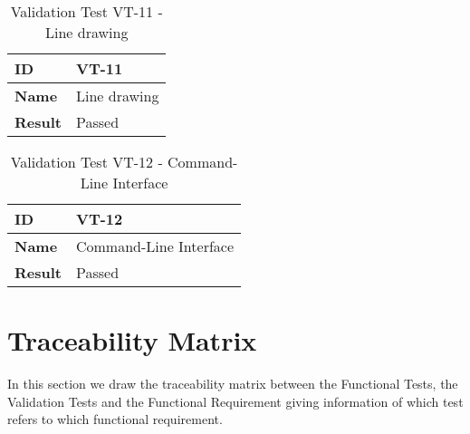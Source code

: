 \begin{table}[H]
    \centering
    \begin{tabular}{| p{3cm} | p{7cm} |}
    \hline
    \textbf{ID}             & VT-11 \\ \hline
    \textbf{Name}           & Line drawing\\ \hline
    \textbf{Result}         & \textcolor{mygreen}{Passed}\\ \hline
    \end{tabular}
    \caption{Validation Test VT-11 - Line drawing}
\end{table}

\begin{table}[H]
    \centering
    \begin{tabular}{| p{3cm} | p{7cm} |}
    \hline
    \textbf{ID}             & VT-12 \\ \hline
    \textbf{Name}           & Command-Line Interface\\ \hline
    \textbf{Result}         & \textcolor{mygreen}{Passed}\\ \hline
    \end{tabular}
    \caption{Validation Test VT-12 - Command-Line Interface}
\end{table}


\section{Traceability Matrix}
In this section we draw the traceability matrix between the Functional Tests, the Validation Tests and the Functional Requirement giving information of which test refers to which functional requirement.


